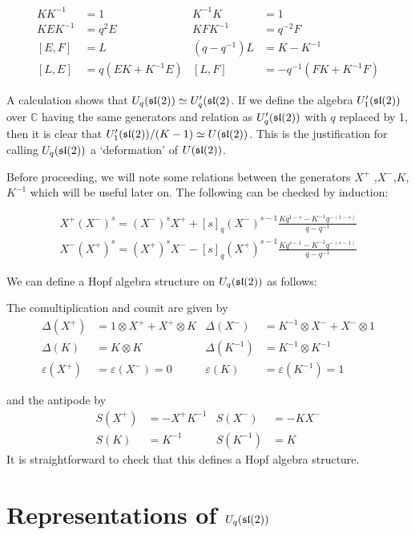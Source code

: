 \begin{align}
    KK^{-1} &= 1 &  K^{-1}K  &=1 \\
    KEK^{-1} &= q^2 E & KFK^{-1} &= q^{-2} F \\
    [E,F] &= L  & (q - q^{-1})L &= K-K^{-1} \\
    [L,E] &= q(EK + K^{-1}E) & [L,F] &= -q^{-1}(FK + K^{-1}F)
\end{align}

A calculation shows that $U_q(\mathfrak{sl}(2)) \simeq U_q'(\mathfrak{sl}(2)$. If we define the
algebra $U_1'(\mathfrak{sl}(2))$ over $\mathbb{C}$ having the same generators and
relation as $U_q'(\mathfrak{sl}(2))$ with $q$ replaced by 1, then it is clear that
$U_1'(\mathfrak{sl}(2)) /(K-1) \simeq U(\mathfrak{sl}(2))$. This is the justification for calling
$U_q(\mathfrak{sl}(2))$ a `deformation' of $U(\mathfrak{sl}(2))$.

Before proceeding, we will note some relations between the generators
$X^+$ ,$X^-$,$K$,$K^{-1}$ which will be useful later on. The following can be checked
by induction:

\begin{align}
    \label{EFrelations}
     X^+ (X^-)^s = (X^-)^s X^+  + [s]_q (X^-)^{s-1} \frac{Kq^{1-s} - K^{-1} q^{-(1-s)}}{q-q^{-1}} \\
    X^- (X^+)^s =  (X^+)^sX^- - [s]_q  (X^+)^{s-1} \frac{Kq^{s-1} - K^{-1} q^{-(s-1)}}{q-q^{-1}}
\end{align}

We can define a Hopf algebra structure on $U_q(\mathfrak{sl}(2))$ as follows:

The comultiplication and counit are given by
\begin{align}
    \Delta(X^+) &= 1 \otimes  X^+  +  X^+  \otimes K &  \Delta(X^-) &= K^{-1} \otimes X^- + X^- \otimes 1 \\
    \Delta(K) &= K \otimes K &  \Delta(K^{-1}) &= K^{-1} \otimes K^{-1}\\ 
    \varepsilon( X^+ ) &= \varepsilon(X^-) = 0 &  \varepsilon(K) &= \varepsilon(K^{-1}) = 1
\end{align}

and the antipode by
\begin{align}
    S(X^+) &= - X^+ K^{-1} & S(X^-)      &= -KX^- \\
    S(K) &= K^{-1}   & S(K^{-1}) &= K 
\end{align}
It is straightforward to check that this defines a Hopf algebra structure. 

\section{Representations of $U_q(\mathfrak{sl}(2))$}

